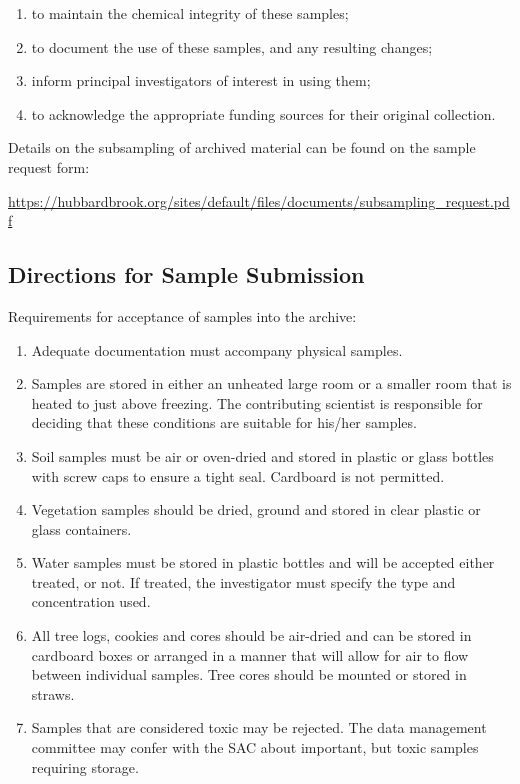 \documentclass[
  letterpaper,
  DIV=11,
  numbers=noendperiod]{scrreprt}
\begin{document}
\begin{enumerate}
\def\labelenumi{\arabic{enumi}.}
\item
  to maintain the chemical integrity of these samples;
\item
  to document the use of these samples, and any resulting changes;
\item
  inform principal investigators of interest in using them;
\item
  to acknowledge the appropriate funding sources for their original
  collection.
\end{enumerate}

Details on the subsampling of archived material can be found on the
sample request form:

\url{https://hubbardbrook.org/sites/default/files/documents/subsampling_request.pdf}

\subsection{Directions for Sample
Submission}\label{directions-for-sample-submission}

Requirements for acceptance of samples into the archive:

\begin{enumerate}
\def\labelenumi{\arabic{enumi}.}
\item
  Adequate documentation must accompany physical samples.
\item
  Samples are stored in either an unheated large room or a smaller room
  that is heated to just above freezing. The contributing scientist is
  responsible for deciding that these conditions are suitable for
  his/her samples.
\item
  Soil samples must be air or oven-dried and stored in plastic or glass
  bottles with screw caps to ensure a tight seal. Cardboard is not
  permitted.
\item
  Vegetation samples should be dried, ground and stored in clear plastic
  or glass containers.
\item
  Water samples must be stored in plastic bottles and will be accepted
  either treated, or not. If treated, the investigator must specify the
  type and concentration used.
\item
  All tree logs, cookies and cores should be air-dried and can be stored
  in cardboard boxes or arranged in a manner that will allow for air to
  flow between individual samples. Tree cores should be mounted or
  stored in straws.
\item
  Samples that are considered toxic may be rejected. The data management
  committee may confer with the SAC about important, but toxic samples
  requiring storage.
\end{enumerate}
\end{document}
